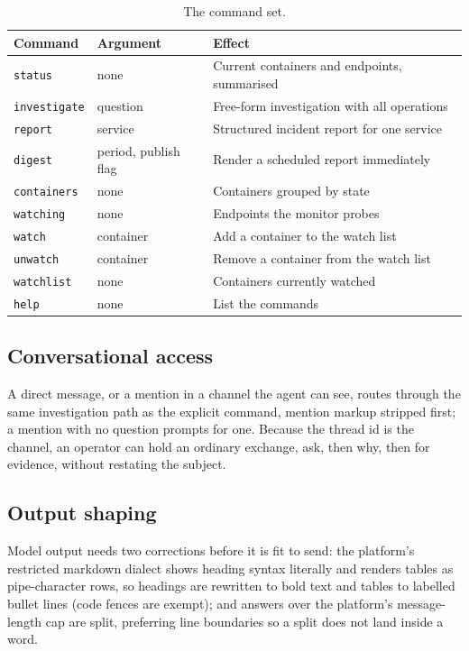 \documentclass[11pt,a4paper]{article}
\begin{document}
\begin{table}[H]
\centering\small
\begin{tabularx}{\textwidth}{|l|l|X|}
\hline
\textbf{Command} & \textbf{Argument} & \textbf{Effect} \\
\hline
\texttt{status} & none & Current containers and endpoints, summarised \\
\hline
\texttt{investigate} & question & Free-form investigation with all operations \\
\hline
\texttt{report} & service & Structured incident report for one service \\
\hline
\texttt{digest} & period, publish flag & Render a scheduled report immediately \\
\hline
\texttt{containers} & none & Containers grouped by state \\
\hline
\texttt{watching} & none & Endpoints the monitor probes \\
\hline
\texttt{watch} & container & Add a container to the watch list \\
\hline
\texttt{unwatch} & container & Remove a container from the watch list \\
\hline
\texttt{watchlist} & none & Containers currently watched \\
\hline
\texttt{help} & none & List the commands \\
\hline
\end{tabularx}
\caption{The command set.}
\label{tab:commands}
\end{table}

\subsection{Conversational access}

A direct message, or a mention in a channel the agent can see, routes through the
same investigation path as the explicit command, mention markup stripped first; a
mention with no question prompts for one. Because the thread id is the channel, an
operator can hold an ordinary exchange, ask, then why, then for evidence, without
restating the subject.

\subsection{Output shaping}
\label{sec:shaping}

Model output needs two corrections before it is fit to send: the platform's
restricted markdown dialect shows heading syntax literally and renders tables as
pipe-character rows, so headings are rewritten to bold text and tables to labelled
bullet lines (code fences are exempt); and answers over the platform's message-length
cap are split, preferring line boundaries so a split does not land inside a word.
\end{document}
